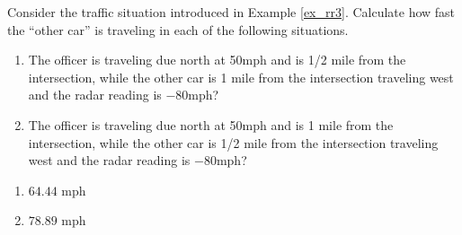 {Consider the traffic situation introduced in Example \ref{ex_rr3}. Calculate how fast the ``other car'' is traveling in each of the following situations.
	\begin{enumerate}
	\item The officer is traveling due north at 50mph and is 1/2 mile from the intersection, while the other car is 1 mile from the intersection traveling west and the radar reading is $-80$mph?
	\item The officer is traveling due north at 50mph and is 1 mile from the intersection, while the other car is 1/2 mile from the intersection traveling west and the radar reading is $-80$mph?
	\end{enumerate}
}
{\begin{enumerate}
	\item $64.44$ mph
	\item	$78.89$ mph
\end{enumerate}
}

